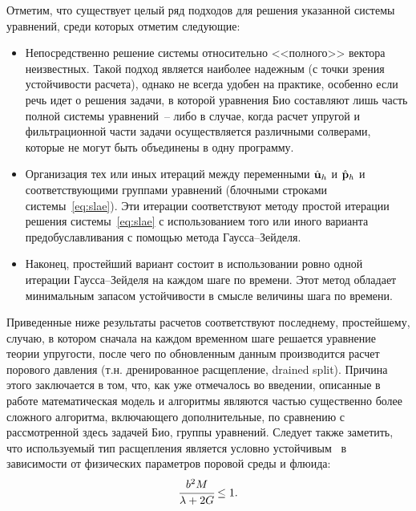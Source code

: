 Отметим, что существует целый ряд подходов для решения указанной системы уравнений, среди которых отметим следующие:
\begin{itemize}
\item 
Непосредственно решение системы относительно <<полного>> вектора неизвестных.
Такой подход является наиболее надежным (с точки зрения устойчивости расчета), 
однако не всегда удобен на практике, особенно если речь идет
о решения задачи, в которой уравнения Био составляют лишь часть полной системы уравнений~--
либо в случае, когда расчет упругой и фильтрационной части задачи осуществляется различными
солверами, которые не могут быть объединены в одну программу.

\item 
Организация тех или иных итераций между переменными $\Hat{\mathbf{u}}_h$ и  $\Hat{\mathbf{p}}_h$
и соответствующими группами уравнений (блочными строками системы~\eqref{eq:slae}). 
Эти итерации соответствуют 
методу простой итерации решения системы~\eqref{eq:slae} с использованием
того или иного варианта предобуславливания с помощью метода Гаусса--Зейделя.

\item 
Наконец, простейший вариант состоит в использовании ровно одной итерации Гаусса--Зейделя
на каждом шаге по времени. Этот метод обладает минимальным запасом устойчивости 
в смысле величины шага по времени.

\end{itemize}

Приведенные ниже результаты расчетов соответствуют последнему, простейшему, случаю,
в котором сначала на каждом временном шаге решается уравнение теории упругости, после чего по
обновленным данным производится расчет порового давления (т.н. дренированное расщепление,
\flqq{}drained split\frqq{}). 
Причина этого заключается в том, что, как уже отмечалось во введении, описанные в работе
математическая модель и алгоритмы 
являются частью существенно более сложного алгоритма, включающего дополнительные, по сравнению
с рассмотренной здесь задачей Био, группы уравнений.
Следует также заметить, что используемый тип расщепления является условно устойчивым~\cite{kim2010}
в зависимости от физических параметров поровой среды и флюида:
%
\begin{equation}
\label{eq:stabconddrained}
%
\cfrac{b^2 M}{\lambda+2G} \le 1.
%
\end{equation} 


\endinput
